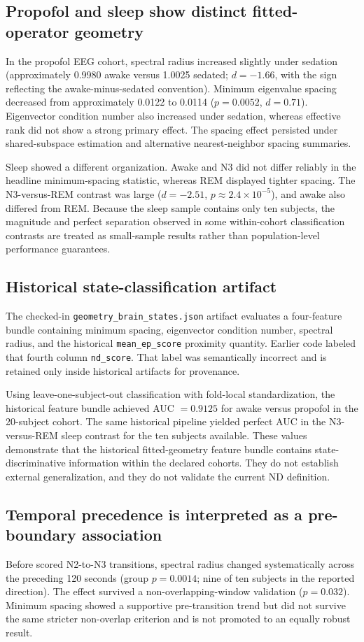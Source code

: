 \documentclass[preprint,12pt,nonatbib]{elsarticle}
\begin{document}
\subsection{Propofol and sleep show distinct fitted-operator geometry}
In the propofol EEG cohort, spectral radius increased slightly under sedation (approximately 0.9980 awake versus 1.0025 sedated; $d=-1.66$, with the sign reflecting the awake-minus-sedated convention). Minimum eigenvalue spacing decreased from approximately 0.0122 to 0.0114 ($p=0.0052$, $d=0.71$). Eigenvector condition number also increased under sedation, whereas effective rank did not show a strong primary effect. The spacing effect persisted under shared-subspace estimation and alternative nearest-neighbor spacing summaries.

Sleep showed a different organization. Awake and N3 did not differ reliably in the headline minimum-spacing statistic, whereas REM displayed tighter spacing. The N3-versus-REM contrast was large ($d=-2.51$, $p\approx2.4\times10^{-5}$), and awake also differed from REM. Because the sleep sample contains only ten subjects, the magnitude and perfect separation observed in some within-cohort classification contrasts are treated as small-sample results rather than population-level performance guarantees.

\subsection{Historical state-classification artifact}
The checked-in \texttt{geometry\_brain\_states.json} artifact evaluates a four-feature bundle containing minimum spacing, eigenvector condition number, spectral radius, and the historical \texttt{mean\_ep\_score} proximity quantity. Earlier code labeled that fourth column \texttt{nd\_score}. That label was semantically incorrect and is retained only inside historical artifacts for provenance.

Using leave-one-subject-out classification with fold-local standardization, the historical feature bundle achieved AUC $=0.9125$ for awake versus propofol in the 20-subject cohort. The same historical pipeline yielded perfect AUC in the N3-versus-REM sleep contrast for the ten subjects available. These values demonstrate that the historical fitted-geometry feature bundle contains state-discriminative information within the declared cohorts. They do not establish external generalization, and they do not validate the current ND definition.

\subsection{Temporal precedence is interpreted as a pre-boundary association}
Before scored N2-to-N3 transitions, spectral radius changed systematically across the preceding 120 seconds (group $p=0.0014$; nine of ten subjects in the reported direction). The effect survived a non-overlapping-window validation ($p=0.032$). Minimum spacing showed a supportive pre-transition trend but did not survive the same stricter non-overlap criterion and is not promoted to an equally robust result.
\end{document}
